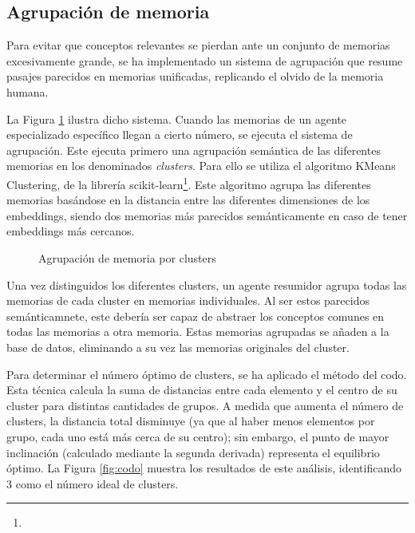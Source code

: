 \subsection{Agrupación de memoria}
Para evitar que conceptos relevantes se pierdan ante un conjunto de memorias excesivamente grande, se ha implementado un sistema de agrupación que resume pasajes parecidos en memorias unificadas, replicando el olvido de la memoria humana. 

La Figura \ref{fig:mem_2} ilustra dicho sistema. Cuando las memorias de un agente especializado específico llegan a cierto número, se ejecuta el sistema de agrupación. Este ejecuta primero una agrupación semántica de las diferentes memorias en los denominados \textit{clusters}. Para ello se utiliza el algoritmo KMeans Clustering, de la librería scikit-learn\footnote{}. Este algoritmo agrupa las diferentes memorias basándose en la distancia entre las diferentes dimensiones de los embeddings, siendo dos memorias más parecidos semánticamente en caso de tener embeddings más cercanos. 

\begin{figure}[h]
\centering
{}
\caption{Agrupación de memoria por clusters}
\label{fig:mem_2}
\end{figure}

Una vez distinguidos los diferentes clusters, un agente resumidor agrupa todas las memorias de cada cluster en memorias individuales. Al ser estos parecidos semánticamnete, este debería ser capaz de abstraer los conceptos comunes en todas las memorias a otra memoria. Estas memorias agrupadas se añaden a la base de datos, eliminando a su vez las memorias originales del cluster. 

Para determinar el número óptimo de clusters, se ha aplicado el método del codo. Esta técnica calcula la suma de distancias entre cada elemento y el centro de su cluster para distintas cantidades de grupos. A medida que aumenta el número de clusters, la distancia total disminuye (ya que al haber menos elementos por grupo, cada uno está más cerca de su centro); sin embargo, el punto de mayor inclinación (calculado mediante la segunda derivada) representa el equilibrio óptimo. La Figura \ref{fig:codo} muestra los resultados de este análisis, identificando 3 como el número ideal de clusters.

